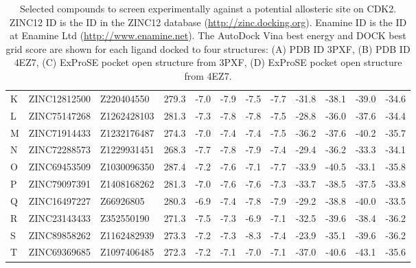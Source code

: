 \begin{table}
\begin{footnotesize}
\begin{tabular}{ p{2cm} l l p{2.5cm} l l l l l l l l }
K & ZINC12812500 & Z220404550  & 279.3 & -7.0 & -7.9 & -7.5 & -7.7 & -31.8 & -38.1 & -39.0 & -34.6 \\
L & ZINC75147268 & Z1262428103 & 281.3 & -7.3 & -7.8 & -7.8 & -7.5 & -28.8 & -36.0 & -37.6 & -34.4 \\
M & ZINC71914433 & Z1232176487 & 274.3 & -7.0 & -7.4 & -7.4 & -7.5 & -36.2 & -37.6 & -40.2 & -35.7 \\
N & ZINC72288573 & Z1229931451 & 268.3 & -7.7 & -7.8 & -7.9 & -7.4 & -29.4 & -36.2 & -33.3 & -34.1 \\
O & ZINC69453509 & Z1030096350 & 287.4 & -7.2 & -7.6 & -7.1 & -7.7 & -33.9 & -40.5 & -33.1 & -35.8 \\
P & ZINC79097391 & Z1408168262 & 281.3 & -7.0 & -7.6 & -7.6 & -7.3 & -33.7 & -38.5 & -37.5 & -33.8 \\
Q & ZINC16497227 & Z66926805   & 280.3 & -6.9 & -7.4 & -7.8 & -7.9 & -29.2 & -38.8 & -40.0 & -33.5 \\
R & ZINC23143433 & Z352550190  & 271.3 & -7.5 & -7.3 & -6.9 & -7.1 & -32.5 & -39.6 & -38.4 & -36.2 \\
S & ZINC89858262 & Z1162482939 & 273.3 & -7.2 & -7.3 & -8.3 & -7.4 & -23.9 & -35.1 & -39.6 & -36.2 \\
T & ZINC69369685 & Z1097406485 & 272.3 & -7.2 & -7.1 & -7.0 & -7.1 & -37.0 & -40.6 & -43.1 & -35.6 \\
\hline
\end{tabular}
\end{footnotesize}

\caption[Selected compounds to screen experimentally against a potential allosteric site on CDK2]
{Selected compounds to screen experimentally against a potential allosteric site on CDK2.
ZINC12 ID is the ID in the ZINC12 database (\url{http://zinc.docking.org}).
Enamine ID is the ID at Enamine Ltd (\url{http://www.enamine.net}).
The AutoDock Vina best energy and DOCK best grid score are shown for each ligand docked to four structures:
(A) PDB ID 3PXF,
(B) PDB ID 4EZ7,
(C) ExProSE pocket open structure from 3PXF,
(D) ExProSE pocket open structure from 4EZ7.}

\label{tab:enamine_compounds}
\end{table}


